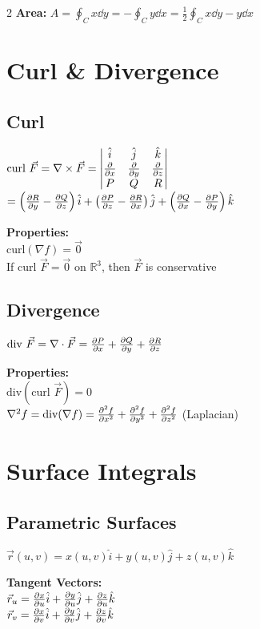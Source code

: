 \documentclass[8pt]{extarticle}
\newcommand{\R}{\mathbb{R}}
\begin{document}
\begin{multicols}{2}
\textbf{Area:} $A = \oint_C x\dd{y} = -\oint_C y\dd{x} = \frac{1}{2}\oint_C x\dd{y} - y\dd{x}$

\section*{Curl \& Divergence}

\subsection*{Curl}
$\text{curl }\vec{F} = \nabla \times \vec{F} = \begin{vmatrix} \hat{i} & \hat{j} & \hat{k} \\ \pdv{}{x} & \pdv{}{y} & \pdv{}{z} \\ P & Q & R \end{vmatrix}$ \\
$= \left(\pdv{R}{y} - \pdv{Q}{z}\right)\hat{i} + \left(\pdv{P}{z} - \pdv{R}{x}\right)\hat{j} + \left(\pdv{Q}{x} - \pdv{P}{y}\right)\hat{k}$

\textbf{Properties:} \\
$\text{curl}(\nabla f) = \vec{0}$ \\
If $\text{curl }\vec{F} = \vec{0}$ on $\R^3$, then $\vec{F}$ is conservative

\subsection*{Divergence}
$\text{div }\vec{F} = \nabla \cdot \vec{F} = \pdv{P}{x} + \pdv{Q}{y} + \pdv{R}{z}$

\textbf{Properties:} \\
$\text{div}(\text{curl }\vec{F}) = 0$ \\
$\nabla^2 f = \text{div}(\nabla f) = \pdv[2]{f}{x} + \pdv[2]{f}{y} + \pdv[2]{f}{z}$ (Laplacian)

\section*{Surface Integrals}

\subsection*{Parametric Surfaces}
$\vec{r}(u,v) = x(u,v)\hat{i} + y(u,v)\hat{j} + z(u,v)\hat{k}$

\textbf{Tangent Vectors:} \\
$\vec{r}_u = \pdv{x}{u}\hat{i} + \pdv{y}{u}\hat{j} + \pdv{z}{u}\hat{k}$ \\
$\vec{r}_v = \pdv{x}{v}\hat{i} + \pdv{y}{v}\hat{j} + \pdv{z}{v}\hat{k}$


\end{multicols}
\end{document}
